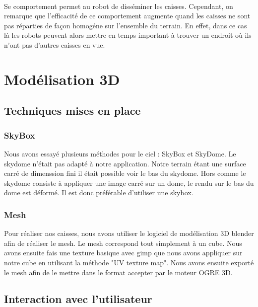 \paragraph{}Se comportement permet au robot de disséminer les caisses.
Cependant, on remarque que l'efficacité de ce comportement augmente quand les
caisses ne sont pas réparties de façon homogéne sur l'ensemble du terrain. En
effet, dans ce cas là les robots peuvent alors mettre en temps important à
trouver un endroit où ils n'ont pas d'autres caisses en vue. 

\section{Modélisation 3D}


\subsection{Techniques mises en place}
\subsubsection{SkyBox}
Nous avons essayé plusieurs méthodes pour le ciel : SkyBox et SkyDome. Le
skydome n'était pas adapté à notre application. Notre terrain étant une
surface carré de dimenssion fini il était possible voir le bas du skydome.
Hors comme le skydome consiste à appliquer une image carré sur un dome, le
rendu sur le bas du dome est déformé. Il est donc préférable d'utiliser une
skybox.

\subsubsection{Mesh}
Pour réaliser nos caisses, nous avons utiliser le logiciel de modélisation 3D
blender afin de réaliser le mesh. Le mesh correspond tout simplement à un
cube. Nous avons ensuite fais une texture basique avec gimp que nous avons
appliquer sur notre cube en utilisant la méthode "UV texture map".
Nous avons ensuite exporté le mesh afin de le mettre dans le format
accepter par le moteur OGRE 3D. 


\subsection{Interaction avec l'utilisateur}

